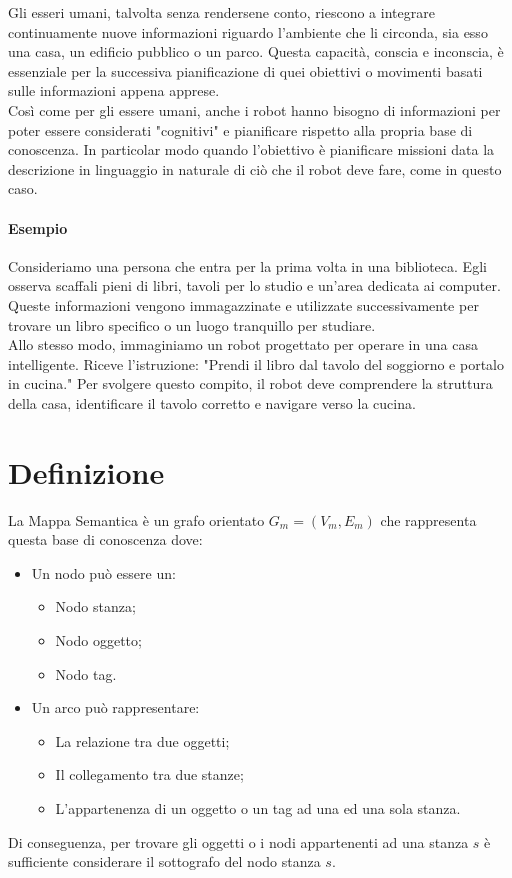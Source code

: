 Gli esseri umani, talvolta senza rendersene conto, riescono a integrare continuamente nuove informazioni riguardo l'ambiente che li circonda, sia esso una casa, un edificio pubblico o un parco. Questa capacità, conscia e inconscia, è essenziale per la successiva pianificazione di quei obiettivi o movimenti basati sulle informazioni appena apprese. \\
Così come per gli essere umani, anche i robot hanno bisogno di informazioni per poter essere considerati "cognitivi" e pianificare rispetto alla propria base di conoscenza. In particolar modo quando l'obiettivo è pianificare missioni data la descrizione in linguaggio in naturale di ciò che il robot deve fare, come in questo caso.

\paragraph*{Esempio}
Consideriamo una persona che entra per la prima volta in una biblioteca. Egli osserva scaffali pieni di libri, tavoli per lo studio e un'area dedicata ai computer. Queste informazioni vengono immagazzinate e utilizzate successivamente per trovare un libro specifico o un luogo tranquillo per studiare.\\
Allo stesso modo, immaginiamo un robot progettato per operare in una casa intelligente. Riceve l'istruzione: "Prendi il libro dal tavolo del soggiorno e portalo in cucina." Per svolgere questo compito, il robot deve comprendere la struttura della casa, identificare il tavolo corretto e navigare verso la cucina.

\section{Definizione}
La Mappa Semantica è un grafo orientato $G_m = (V_m, E_m)$ che rappresenta questa base di conoscenza dove:
\begin{itemize}
  \item Un nodo può essere un:
        \begin{itemize}
          \item Nodo stanza;
          \item Nodo oggetto;
          \item Nodo tag.
        \end{itemize}
  \item Un arco può rappresentare:
        \begin{itemize}
          \item La relazione tra due oggetti;
          \item Il collegamento tra due stanze;
          \item L'appartenenza di un oggetto o un tag ad una ed una sola stanza.
        \end{itemize}
\end{itemize}
Di conseguenza, per trovare gli oggetti o i nodi appartenenti ad una stanza $s$ è sufficiente considerare il sottografo del nodo stanza $s$.

